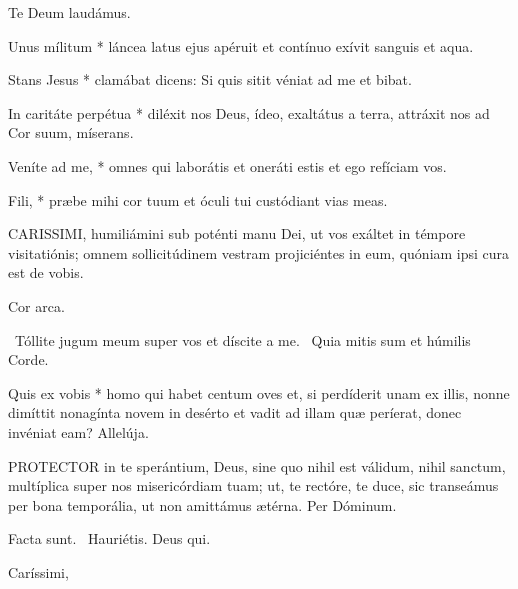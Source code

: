 Te Deum laudámus.



 Unus mílitum * láncea latus ejus apéruit et contínuo exívit sanguis et aqua.


 Stans Jesus * clamábat dicens: Si quis sitit véniat ad me et bibat.

 In caritáte perpétua * diléxit nos Deus, ídeo, exaltátus a terra, attráxit nos ad Cor suum, míserans.

 Veníte ad me, * omnes qui laborátis et oneráti estis et ego refíciam vos.

 Fili, * præbe mihi cor tuum et óculi tui custódiant vias meas.


\lettrine[lines=2]{C}{ARISSIMI}, humiliámini sub poténti manu Dei, ut vos exáltet in témpore visitatiónis; omnem sollicitúdinem vestram projiciéntes in eum, quóniam ipsi cura est de vobis.

 Cor arca. 

\V\ Tóllite jugum meum super vos et díscite a me. \R\ Quia mitis sum et húmilis Corde.

 Quis ex vobis * homo qui habet centum oves et, si perdíderit unam ex illis, nonne dimíttit nonagínta novem in desérto et vadit ad illam quæ períerat, donec invéniat eam? Allelúja.


\lettrine[lines=2]{P}{ROTECTOR} in te sperántium, Deus, sine quo nihil est válidum, nihil sanctum, multíplica super nos misericórdiam tuam; ut, te rectóre, te duce, sic transeámus per bona temporália, ut non amittámus ætérna. Per Dóminum.


 Facta sunt. \V\ Hauriétis.  Deus qui. 



 Caríssimi, 

